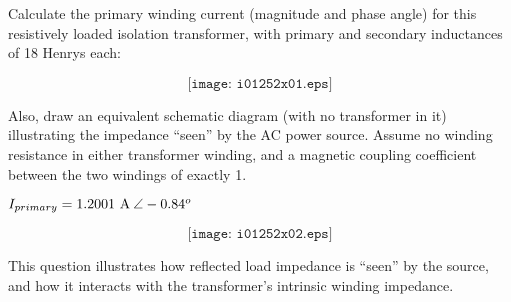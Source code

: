 

Calculate the primary winding current (magnitude and phase angle) for this resistively loaded isolation transformer, with primary and secondary inductances of 18 Henrys each:

$$\texttt{[image: i01252x01.eps]}$$

Also, draw an equivalent schematic diagram (with no transformer in it) illustrating the impedance ``seen'' by the AC power source.  Assume no winding resistance in either transformer winding, and a magnetic coupling coefficient between the two windings of exactly 1.







$I_{primary} = 1.2001 \hbox{ A} \> \angle -0.84^o$

$$\texttt{[image: i01252x02.eps]}$$







This question illustrates how reflected load impedance is ``seen'' by the source, and how it interacts with the transformer's intrinsic winding impedance.




